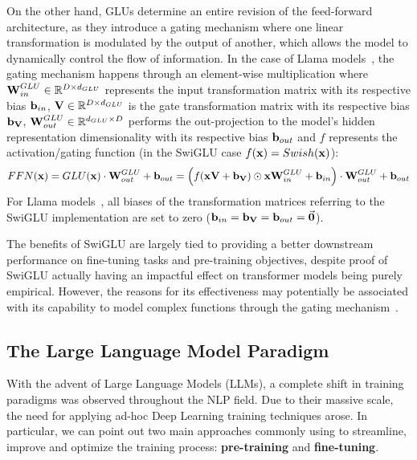 On the other hand, GLUs determine an entire revision of the feed-forward architecture, as they introduce a gating mechanism where one linear transformation is modulated by the output of another, which allows the model to dynamically control the flow of information.
In the case of Llama models~\cite{touvron2023,dubey2024}, the gating mechanism happens through an element-wise multiplication where $\bm{\mathbf{W}}_{in}^{GLU} \in \mathbb{R}^{D \times d_{GLU}}$ represents the input transformation matrix with its respective bias $\bm{\mathbf{b}}_{in}$, $\bm{\mathbf{V}} \in \mathbb{R}^{D \times d_{GLU}}$ is the gate transformation matrix with its respective bias $\bm{\mathbf{b_{V}}}$, $\bm{\mathbf{W}}_{out}^{GLU} \in \mathbb{R}^{d_{GLU} \times D}$ performs the out-projection to the model's hidden representation dimensionality with its respective bias $\bm{\mathbf{b}}_{out}$ and $f$ represents the activation/gating function (in the SwiGLU case $f(\bm{\mathbf{x}}) = Swish(\bm{\mathbf{x}})$):
\begin{equation}
    \label{eq:background_ffnn}
    FFN(\bm{\mathbf{x}}) = GLU(\bm{\mathbf{x}}) \cdot \bm{\mathbf{W}}_{out}^{GLU} + \bm{\mathbf{b}}_{out} 
    = \Bigl( f(\bm{\mathbf{x}}\bm{\mathbf{V}} + \bm{\mathbf{b_V}}) \odot \bm{\mathbf{x}}\bm{\mathbf{W}}_{in}^{GLU} + \bm{\mathbf{b}}_{in} \Bigr) \cdot \bm{\mathbf{W}}_{out}^{GLU} + \bm{\mathbf{b}}_{out}
\end{equation}
For Llama models~\cite{touvron2023,dubey2024}, all biases of the transformation matrices referring to the SwiGLU implementation are set to zero ($\bm{\mathbf{b}}_{in} = \bm{\mathbf{b_V}} = \bm{\mathbf{b}}_{out} = \vec {\bm{\mathbf{0}}}$).

The benefits of SwiGLU are largely tied to providing a better downstream performance on fine-tuning tasks and pre-training objectives, despite proof of SwiGLU actually having an impactful effect on transformer models being purely empirical.
However, the reasons for its effectiveness may potentially be associated with its capability to model complex functions through the gating mechanism~\cite{shazeer2020,shibuya2023}.

\subsection{The Large Language Model Paradigm}

With the advent of Large Language Models (LLMs), a complete shift in training paradigms was observed throughout the NLP field.
Due to their massive scale, the need for applying ad-hoc Deep Learning training techniques arose.
In particular, we can point out two main approaches commonly using to streamline, improve and optimize the training process: \textbf{pre-training} and \textbf{fine-tuning}.

